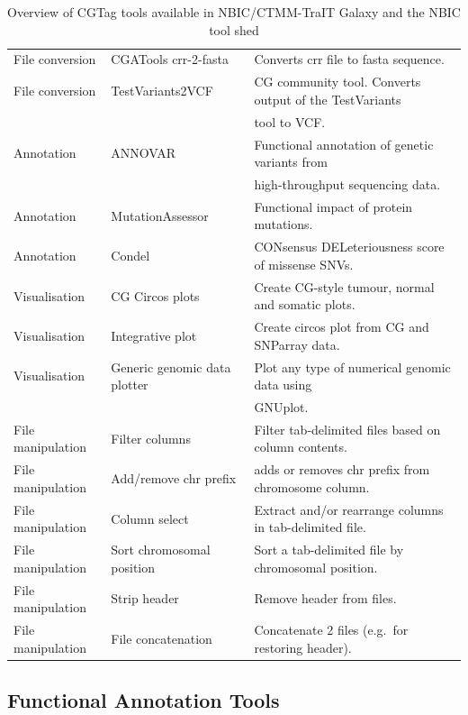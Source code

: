 \begin{table}[t!]
\begin{tabular}{l|l|l}
File conversion   & CGATools crr-2-fasta  & Converts crr file to fasta sequence.\\
File conversion   & TestVariants2VCF      & CG community tool. Converts output of the TestVariants \\
                  &                       & tool to VCF.\\
Annotation        & ANNOVAR               & Functional annotation of genetic variants from \\
                  &                       & high-throughput sequencing data.\\
Annotation        & MutationAssessor      & Functional impact of protein mutations.\\
Annotation        & Condel                & CONsensus DELeteriousness score of missense SNVs.\\
Visualisation     & CG Circos plots       & Create CG-style tumour, normal and somatic plots.\\
Visualisation     & Integrative plot      & Create circos plot from CG and SNParray data.\\
Visualisation     & Generic genomic data plotter & Plot any type of numerical genomic data using\\
                  &                       & GNUplot.\\
File manipulation & Filter columns        & Filter tab-delimited files based on column contents.\\
File manipulation & Add/remove chr prefix & adds or removes chr prefix from chromosome column.\\
File manipulation & Column select         & Extract and/or rearrange columns in tab-delimited file.\\
File manipulation & Sort chromosomal position & Sort a tab-delimited file by chromosomal position.\\
File manipulation & Strip header          & Remove header from files.\\
File manipulation & File concatenation    & Concatenate 2 files (e.g.\ for restoring header).\\

\end{tabular}
\caption{Overview of CGTag tools available in NBIC/CTMM-TraIT Galaxy and the NBIC tool shed}\label{table:tools}
\end{table}
\normalsize


\subsection*{Functional Annotation Tools}

